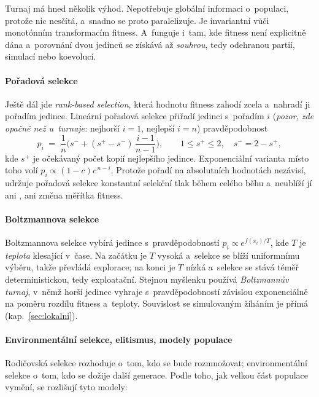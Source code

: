 \documentclass[11pt,a4paper]{article}
\theoremstyle{definition}
\begin{document}
Turnaj má hned několik výhod. Nepotřebuje globální informaci o~populaci, protože nic
nesčítá, a~snadno se proto paralelizuje. Je invariantní vůči monotónním transformacím
fitness. A~funguje i~tam, kde fitness není explicitně dána a~porovnání dvou jedinců se
získává až \emph{souhrou}, tedy odehranou partií, simulací nebo koevolucí.

\paragraph{Pořadová selekce}

Ještě dál jde \emph{rank-based selection}, která hodnotu fitness zahodí zcela a~nahradí ji
pořadím jedince. Lineární pořadová selekce přiřadí jedinci s~pořadím $i$ (\emph{pozor, zde
opačně než u~turnaje:} nejhorší $i=1$, nejlepší $i=n$)
pravděpodobnost
\[
p_i \;=\; \frac{1}{n}\Big(s^{-} + (s^{+}-s^{-})\,\frac{i-1}{n-1}\Big),
\qquad 1 \le s^{+} \le 2,\quad s^{-} = 2 - s^{+},
\]
kde $s^{+}$ je očekávaný počet kopií nejlepšího jedince. Exponenciální varianta místo toho
volí $p_i \propto (1-c)c^{\,n-i}$. Protože pořadí na absolutních hodnotách nezávisí, udržuje
pořadová selekce konstantní selekční tlak během celého běhu a~neublíží jí ani ,
ani změna měřítka fitness.

\paragraph{Boltzmannova selekce}

Boltzmannova selekce vybírá jedince s~pravděpodobností $p_i \propto e^{f(x_i)/T}$, kde $T$ je
\emph{teplota} klesající v~čase. Na začátku je $T$ vysoká a~selekce se blíží uniformnímu
výběru, takže převládá explorace; na konci je $T$ nízká a~selekce se stává téměř
deterministickou, tedy exploatační. Stejnou myšlenku používá \emph{Boltzmannův turnaj},
v~němž horší jedinec vyhraje s~pravděpodobností závislou exponenciálně na poměru rozdílu
fitness a~teploty. Souvislost se simulovaným žíháním je přímá (kap.~\ref{sec:lokalni}).

\paragraph{Environmentální selekce, elitismus, modely populace}

Rodičovská selekce rozhoduje o~tom, kdo se bude rozmnožovat; environmentální selekce
o~tom, kdo se dožije další generace. Podle toho, jak velkou část populace vymění, se
rozlišují tyto modely:
\end{document}
